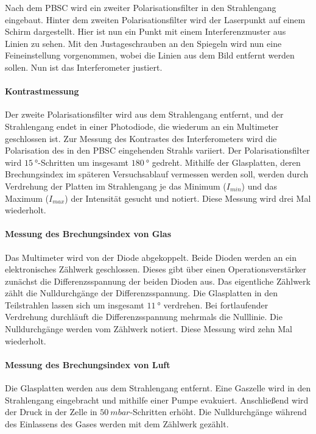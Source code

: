 Nach dem PBSC wird ein zweiter Polarisationsfilter in den Strahlengang eingebaut.
Hinter dem zweiten Polarisationsfilter wird der Laserpunkt auf einem Schirm dargestellt.
Hier ist nun ein Punkt mit einem Interferenzmuster aus Linien zu sehen.
Mit den Justageschrauben an den Spiegeln wird nun eine Feineinstellung vorgenommen, wobei die Linien aus dem Bild entfernt werden sollen.
Nun ist das Interferometer justiert.

\paragraph{Kontrastmessung}
Der zweite Polarisationsfilter wird aus dem Strahlengang entfernt, und der Strahlengang endet in einer Photodiode, die wiederum an ein Multimeter geschlossen ist.
Zur Messung des Kontrastes des Interferometers wird die Polarisation des in den PBSC eingehenden Strahls variiert.
Der Polarisationsfilter wird $\SI{15}{°}$-Schritten um insgesamt $\SI{180}{°}$ gedreht.
Mithilfe der Glasplatten, deren Brechungsindex im späteren Versuchsablauf vermessen werden soll, werden durch Verdrehung der Platten im Strahlengang je das Minimum ($I_{min}$) und das Maximum ($I_{max}$) der Intensität gesucht und notiert.
Diese Messung wird drei Mal wiederholt.

\paragraph{Messung des Brechungsindex von Glas}
Das Multimeter wird von der Diode abgekoppelt.
Beide Dioden werden an ein elektronisches Zählwerk geschlossen.
Dieses gibt über einen Operationsverstärker zunächst die Differenzsspannung der beiden Dioden aus.
Das eigentliche Zählwerk zählt die Nulldurchgänge der Differenzsspannung.
Die Glasplatten in den Teilstrahlen lassen sich um insgesamt $\SI{11}{°}$ verdrehen.
Bei fortlaufender Verdrehung durchläuft die Differenzsspannung mehrmals die Nulllinie.
Die Nulldurchgänge werden vom Zählwerk notiert.
Diese Messung wird zehn Mal wiederholt.

\paragraph{Messung des Brechungsindex von Luft}
Die Glasplatten werden aus dem Strahlengang entfernt.
Eine Gaszelle wird in den Strahlengang eingebracht und mithilfe einer Pumpe evakuiert.
Anschließend wird der Druck in der Zelle in $\SI{50}{mbar}$-Schritten erhöht.
Die Nulldurchgänge während des Einlassens des Gases werden mit dem Zählwerk gezählt.
